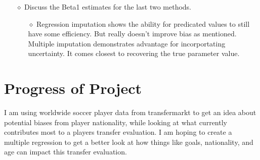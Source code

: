 \documentclass[12pt,letterpaper]{article}
\begin{document}
\clearpage %
\vspace*{1in} %
\begin{itemize}
    \item[$\diamond$] Discuss the Beta1 estimates for the last two methods.
        \begin{itemize}
       \item[$\diamond$] Regression imputation shows the ability for predicated values to still have some efficiency. But really doesn't improve bias as mentioned. Multiple imputation demonstrates advantage for incorportating uncertainty. It comes closest to recovering the true parameter value.  
         \end{itemize}
\end{itemize}

\section{Progress of Project}
I am using worldwide soccer player data from transfermarkt to get an idea about potential biases from player nationality, while looking at what currently contributes most to a players transfer evaluation. I am hoping to create a multiple regression to get a better look at how things like goals, nationality, and age can impact this transfer evaluation. 
\end{document}
